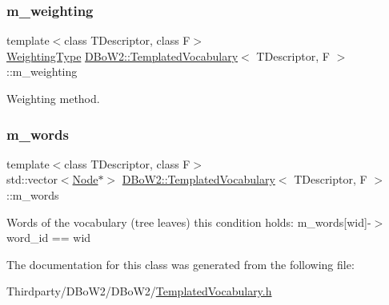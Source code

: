 \subsubsection{\texorpdfstring{m\+\_\+weighting}{m\_weighting}}
{\footnotesize\ttfamily template$<$class T\+Descriptor, class F$>$ \\
\mbox{\hyperlink{namespace_d_bo_w2_a5de5c8a307aca9a84ffefda2a9bc467a}{Weighting\+Type}} \mbox{\hyperlink{class_d_bo_w2_1_1_templated_vocabulary}{D\+Bo\+W2\+::\+Templated\+Vocabulary}}$<$ T\+Descriptor, F $>$\+::m\+\_\+weighting\hspace{0.3cm}{\ttfamily [protected]}}



Weighting method. 

\mbox{\label{class_d_bo_w2_1_1_templated_vocabulary_a1665546b54f954d2d54d59a6982df3ca}} 
\subsubsection{\texorpdfstring{m\+\_\+words}{m\_words}}
{\footnotesize\ttfamily template$<$class T\+Descriptor, class F$>$ \\
std\+::vector$<$\mbox{\hyperlink{struct_d_bo_w2_1_1_templated_vocabulary_1_1_node}{Node}}$\ast$$>$ \mbox{\hyperlink{class_d_bo_w2_1_1_templated_vocabulary}{D\+Bo\+W2\+::\+Templated\+Vocabulary}}$<$ T\+Descriptor, F $>$\+::m\+\_\+words\hspace{0.3cm}{\ttfamily [protected]}}

Words of the vocabulary (tree leaves) this condition holds\+: m\+\_\+words\mbox{[}wid\mbox{]}-\/$>$word\+\_\+id == wid 

The documentation for this class was generated from the following file\+:\begin{DoxyCompactItemize}
\item 
Thirdparty/\+D\+Bo\+W2/\+D\+Bo\+W2/\mbox{\hyperlink{_templated_vocabulary_8h}{Templated\+Vocabulary.\+h}}\end{DoxyCompactItemize}
